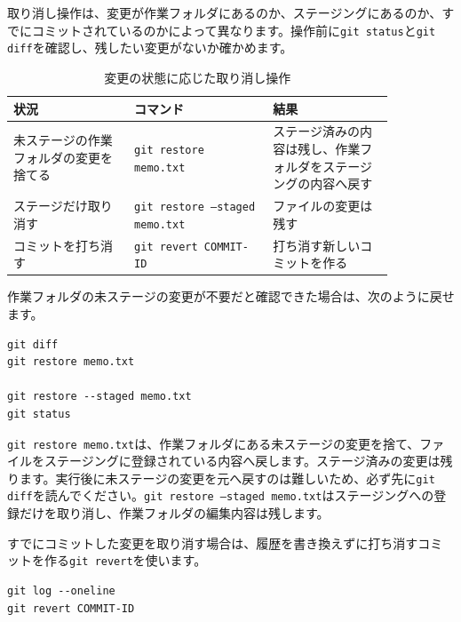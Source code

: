 取り消し操作は、変更が作業フォルダにあるのか、ステージングにあるのか、すでにコミットされているのかによって異なります。操作前に\texttt{git status}と\texttt{git diff}を確認し、残したい変更がないか確かめます。

\begin{table}[htbp]
    \centering
    \caption{変更の状態に応じた取り消し操作}
    \label{tab:appendix-git-undo}
    \begin{tabular}{p{0.27\linewidth}p{0.31\linewidth}p{0.27\linewidth}}
        \toprule
        状況 & コマンド & 結果 \\
        \midrule
        未ステージの作業フォルダの変更を捨てる & \texttt{git restore memo.txt} & ステージ済みの内容は残し、作業フォルダをステージングの内容へ戻す \\
        ステージだけ取り消す & \texttt{git restore --staged memo.txt} & ファイルの変更は残す \\
        コミットを打ち消す & \texttt{git revert COMMIT-ID} & 打ち消す新しいコミットを作る \\
        \bottomrule
    \end{tabular}
\end{table}

作業フォルダの未ステージの変更が不要だと確認できた場合は、次のように戻せます。

\begin{listing}[htbp]
\begin{verbatim}
git diff
git restore memo.txt

git restore --staged memo.txt
git status
\end{verbatim}
\caption{作業フォルダまたはステージングの変更を戻すコマンド}
\label{lst:appendix-git-restore}
\end{listing}

\texttt{git restore memo.txt}は、作業フォルダにある未ステージの変更を捨て、ファイルをステージングに登録されている内容へ戻します。ステージ済みの変更は残ります。実行後に未ステージの変更を元へ戻すのは難しいため、必ず先に\texttt{git diff}を読んでください。\texttt{git restore --staged memo.txt}はステージングへの登録だけを取り消し、作業フォルダの編集内容は残します。

すでにコミットした変更を取り消す場合は、履歴を書き換えずに打ち消すコミットを作る\texttt{git revert}を使います。

\begin{listing}[htbp]
\begin{verbatim}
git log --oneline
git revert COMMIT-ID
\end{verbatim}
\caption{過去のコミットを打ち消す新しいコミットを作るコマンド}
\label{lst:appendix-git-revert}
\end{listing}

